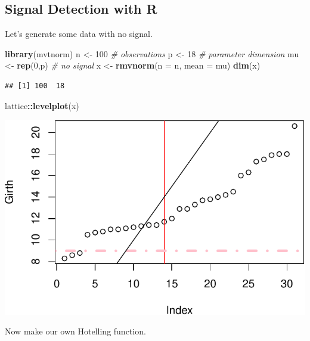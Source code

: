 \documentclass[]{book}
\newenvironment{Shaded}{\begin{snugshade}}{\end{snugshade}}
\newcommand{\CommentTok}[1]{\textcolor[rgb]{0.56,0.35,0.01}{\textit{#1}}}
\newcommand{\DataTypeTok}[1]{\textcolor[rgb]{0.13,0.29,0.53}{#1}}
\newcommand{\DecValTok}[1]{\textcolor[rgb]{0.00,0.00,0.81}{#1}}
\newcommand{\KeywordTok}[1]{\textcolor[rgb]{0.13,0.29,0.53}{\textbf{#1}}}
\newcommand{\NormalTok}[1]{#1}
\newcommand{\OperatorTok}[1]{\textcolor[rgb]{0.81,0.36,0.00}{\textbf{#1}}}
\newcommand{\StringTok}[1]{\textcolor[rgb]{0.31,0.60,0.02}{#1}}
\theoremstyle{definition}
\theoremstyle{definition}
\theoremstyle{definition}
\theoremstyle{remark}
\begin{document}
\hypertarget{signal-detection-with-r}{%
\subsection{Signal Detection with R}\label{signal-detection-with-r}}

Let's generate some data with no signal.

\begin{Shaded}
\begin{Highlighting}[]
\KeywordTok{library}\NormalTok{(mvtnorm)}
\NormalTok{n <-}\StringTok{ }\DecValTok{100} \CommentTok{# observations}
\NormalTok{p <-}\StringTok{ }\DecValTok{18} \CommentTok{# parameter dimension}
\NormalTok{mu <-}\StringTok{ }\KeywordTok{rep}\NormalTok{(}\DecValTok{0}\NormalTok{,p) }\CommentTok{# no signal}
\NormalTok{x <-}\StringTok{ }\KeywordTok{rmvnorm}\NormalTok{(}\DataTypeTok{n =}\NormalTok{ n, }\DataTypeTok{mean =}\NormalTok{ mu)}
\KeywordTok{dim}\NormalTok{(x)}
\end{Highlighting}
\end{Shaded}

\begin{verbatim}
## [1] 100  18
\end{verbatim}

\begin{Shaded}
\begin{Highlighting}[]
\NormalTok{lattice}\OperatorTok{::}\KeywordTok{levelplot}\NormalTok{(x)}
\end{Highlighting}
\end{Shaded}

\includegraphics[width=0.5\linewidth]{Rcourse_files/figure-latex/unnamed-chunk-210-1}

Now make our own Hotelling function.
\end{document}
